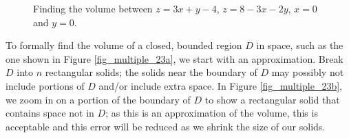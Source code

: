 \begin{figure}[h]
\centering
\qquad
{}
\caption{Finding the volume between $z=3x+y-4$, $z=8-3x-2y$, $x=0$ and $y=0$.}
\end{figure}




To formally find the volume of a closed, bounded region $D$ in space, such as the one shown in Figure \ref{fig_multiple_23a}, we start with an approximation. Break $D$ into $n$ rectangular solids; the solids near the boundary of $D$ may possibly not include portions of $D$ and/or include extra space. In Figure \ref{fig_multiple_23b}, we zoom in on a portion of the boundary of $D$ to show a rectangular solid that contains space not in $D$; as this is an approximation of the volume, this is acceptable and this error will be reduced as we shrink the size of our solids.


